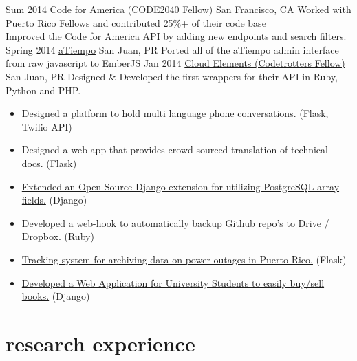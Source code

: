 \documentclass[]{friggeri-cv}
\begin{document}
\begin{entrylist}
\entry
{Sum 2014}
{\href{http://codeforamerica.org}{Code for America (CODE2040 Fellow)}}
{San Francisco, CA}
{\href{https://github.com/CoquiCoders/}{Worked with Puerto Rico Fellows and contributed 25\%+ of their code base} \\
\href{https://github.com/codeforamerica/cfapi}{Improved the Code for America API by adding new endpoints and search filters.}}
\entry
{Spring 2014}
{\href{http://atiempo.com/}{aTiempo}}
{San Juan, PR}
{Ported all of the aTiempo admin interface from raw javascript to EmberJS}
\entry
{Jan 2014}
{\href{http://atiempo.com/}{Cloud Elements (Codetrotters Fellow)}}
{San Juan, PR}
{Designed \& Developed the first wrappers for their API in Ruby, Python and PHP. }
\end{entrylist}

\begin{itemize}
\item \href{https://github.com/chrisrodz/talk}{Designed a platform to hold multi language phone conversations.} (Flask, Twilio API)
\item Designed a web app that provides crowd-sourced translation of technical docs. (Flask)
\item \href{https://github.com/chrisrodz/djorm-ext-pgarray}{Extended an Open Source Django extension for utilizing PostgreSQL array fields.} (Django)
\item \href{https://github.com/chrisrodz/gh-backups}{Developed a web-hook to automatically backup Github repo's to Drive / Dropbox.} (Ruby)
\item \href{http://prepa-down.com/}{Tracking system for archiving data on power outages in Puerto Rico.} (Flask)
\item \href{https://github.com/chrisrodz/libros-online}{Developed a Web Application for University Students to easily buy/sell books.} (Django)
\end{itemize}


\section{research experience}
\end{document}
